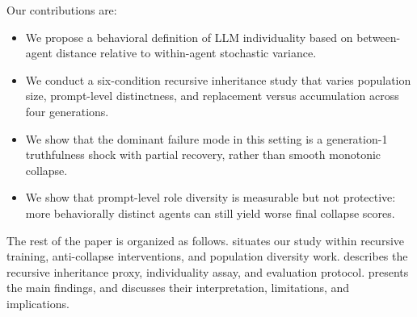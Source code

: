 Our contributions are:
\begin{itemize}[leftmargin=*,itemsep=0pt,topsep=2pt]
    \item We propose a behavioral definition of LLM individuality based on between-agent distance relative to within-agent stochastic variance.
    \item We conduct a six-condition recursive inheritance study that varies population size, prompt-level distinctness, and replacement versus accumulation across four generations.
    \item We show that the dominant failure mode in this setting is a generation-1 truthfulness shock with partial recovery, rather than smooth monotonic collapse.
    \item We show that prompt-level role diversity is measurable but not protective: more behaviorally distinct agents can still yield worse final collapse scores.
\end{itemize}

The rest of the paper is organized as follows.  situates our study within recursive training, anti-collapse interventions, and population diversity work.  describes the recursive inheritance proxy, individuality assay, and evaluation protocol.  presents the main findings, and  discusses their interpretation, limitations, and implications.
